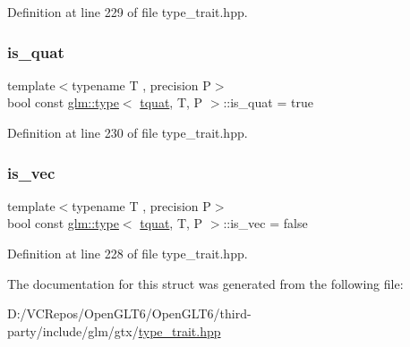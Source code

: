 Definition at line 229 of file type\+\_\+trait.\+hpp.

\mbox{\label{structglm_1_1type_3_01tquat_00_01_t_00_01_p_01_4_a2ba7c2222a48ffb612b8617ded2e3d62}} 
\subsubsection{\texorpdfstring{is\_quat}{is\_quat}}
{\footnotesize\ttfamily template$<$typename T , precision P$>$ \\
bool const \mbox{\hyperlink{structglm_1_1type}{glm\+::type}}$<$ \mbox{\hyperlink{structglm_1_1tquat}{tquat}}, T, P $>$\+::is\+\_\+quat = true\hspace{0.3cm}{\ttfamily [static]}}



Definition at line 230 of file type\+\_\+trait.\+hpp.

\mbox{\label{structglm_1_1type_3_01tquat_00_01_t_00_01_p_01_4_abfe7f7955372e6397a73ada47415aa56}} 
\subsubsection{\texorpdfstring{is\_vec}{is\_vec}}
{\footnotesize\ttfamily template$<$typename T , precision P$>$ \\
bool const \mbox{\hyperlink{structglm_1_1type}{glm\+::type}}$<$ \mbox{\hyperlink{structglm_1_1tquat}{tquat}}, T, P $>$\+::is\+\_\+vec = false\hspace{0.3cm}{\ttfamily [static]}}



Definition at line 228 of file type\+\_\+trait.\+hpp.



The documentation for this struct was generated from the following file\+:\begin{DoxyCompactItemize}
\item 
D\+:/\+V\+C\+Repos/\+Open\+G\+L\+T6/\+Open\+G\+L\+T6/third-\/party/include/glm/gtx/\mbox{\hyperlink{type__trait_8hpp}{type\+\_\+trait.\+hpp}}\end{DoxyCompactItemize}
